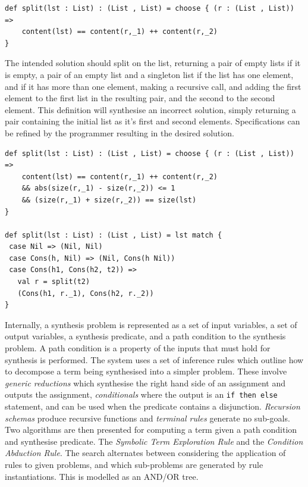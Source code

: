\documentclass[a4paper]{article}
\begin{document}
\begin{center}
\begin{verbatim}
def split(lst : List) : (List , List) = choose { (r : (List , List)) => 
	content(lst) == content(r,_1) ++ content(r,_2)
}
\end{verbatim}
\end{center}

The intended solution should split on the list, returning a pair
of empty lists if it is empty, a pair of an empty list and a singleton
list if the list has one element, and if it has more than one element,
making a recursive call, and adding the first element to the first list
in the resulting pair, and the second to the second element. 
This definition will synthesise an incorrect solution, simply returning
a pair containing the initial list as it's first and second elements. 
Specifications can be refined by the programmer resulting in the 
desired solution.

\begin{center}
\begin{verbatim}
def split(lst : List) : (List , List) = choose { (r : (List , List)) => 
	content(lst) == content(r,_1) ++ content(r,_2)
	&& abs(size(r,_1) - size(r,_2)) <= 1
	&& (size(r,_1) + size(r,_2)) == size(lst)
}

def split(lst : List) : (List , List) = lst match {
 case Nil => (Nil, Nil)
 case Cons(h, Nil) => (Nil, Cons(h Nil))
 case Cons(h1, Cons(h2, t2)) =>
   val r = split(t2)
   (Cons(h1, r._1), Cons(h2, r._2))
}
\end{verbatim}
\end{center}

Internally, a synthesis problem is represented as a set of input variables, a set of output variables,
a synthesis predicate, and a path condition to the synthesis problem. A path condition is a property of the inputs that must 
hold for synthesis is performed. The system uses a 
set of inference rules which outline how to decompose a term being synthesised into a simpler problem. These involve 
\emph{generic reductions} which synthesise the right hand side of an assignment and outputs the assignment, \emph{conditionals} 
where the output is an \texttt{if then else} statement, and can be used when the predicate contains a disjunction. \emph{Recursion schemas}
produce recursive functions and \emph{terminal rules} generate no sub-goals. Two algorithms are then presented for computing a 
term given a path condition and synthesise predicate. The \emph{Symbolic Term Exploration Rule} and the \emph{Condition Abduction Rule}.
The search alternates between considering the application of rules to given problems, and which sub-problems are generated 
by rule instantiations. This is modelled as an AND/OR tree.
\end{document}
